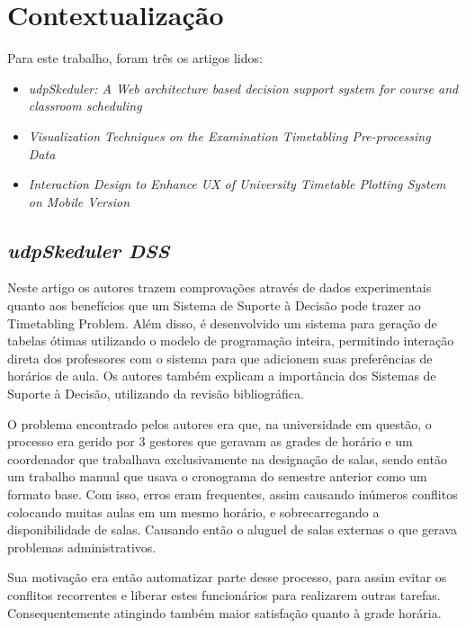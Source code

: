 \chapter{Contextualização} %

Para este trabalho, foram três os artigos lidos:

\begin{itemize}
    \item \textit{udpSkeduler: A Web architecture based decision support system for course and classroom scheduling} \cite{MIRANDA2012505}
    \item \textit{Visualization Techniques on the Examination Timetabling Pre-processing Data} \cite{THOMAS2009}
    \item \textit{Interaction Design to Enhance UX of University Timetable Plotting System on Mobile Version} \cite{ANDRE2018}
\end{itemize}

\section{\textit{udpSkeduler DSS}}

Neste artigo os autores trazem comprovações através de dados experimentais quanto aos benefícios que um Sistema de Suporte à Decisão pode trazer ao Timetabling Problem. Além disso, é desenvolvido um sistema para geração de tabelas ótimas utilizando o modelo de programação inteira, permitindo interação direta dos professores com o sistema para que adicionem suas preferências de horários de aula. Os autores também explicam a importância dos Sistemas de Suporte à Decisão, utilizando da revisão bibliográfica.

O problema encontrado pelos autores era que, na universidade em questão, o processo era gerido por 3 gestores que geravam as grades de horário e um coordenador que trabalhava exclusivamente na designação de salas, sendo então um trabalho manual que usava o cronograma do semestre anterior como um formato base. Com isso, erros eram frequentes, assim causando inúmeros conflitos colocando muitas aulas em um mesmo horário, e sobrecarregando a disponibilidade de salas. Causando então o aluguel de salas externas o que gerava problemas administrativos.

Sua motivação era então automatizar parte desse processo, para assim evitar os conflitos recorrentes e liberar estes funcionários para realizarem outras tarefas. Consequentemente atingindo também maior satisfação quanto à grade horária.

